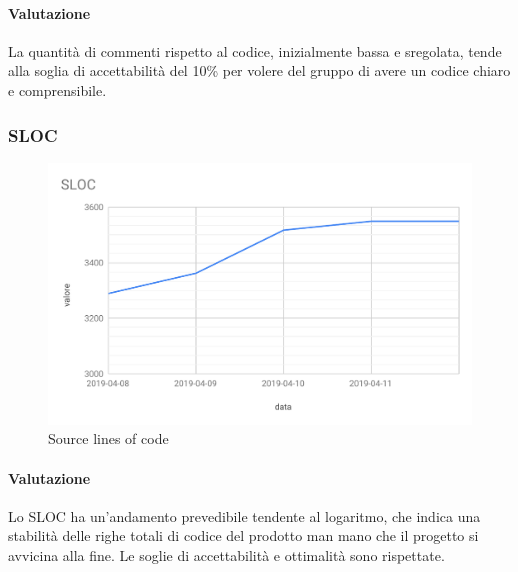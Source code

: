 \paragraph*{Valutazione}
La quantità di commenti rispetto al codice, inizialmente bassa e sregolata, tende alla soglia di accettabilità del 10\% per volere del gruppo di avere un codice chiaro e comprensibile. 





\subsubsection{SLOC}
\begin{figure}[H]
	\centering
	\includegraphics[scale=0.6]{res/images/RA/sloc.pdf}
	\caption{Source lines of code}
\end{figure}
\paragraph*{Valutazione}
Lo SLOC ha un'andamento prevedibile tendente al logaritmo, che indica una stabilità delle righe totali di codice del prodotto man mano che il progetto si avvicina alla fine. Le soglie di accettabilità e ottimalità sono rispettate.


